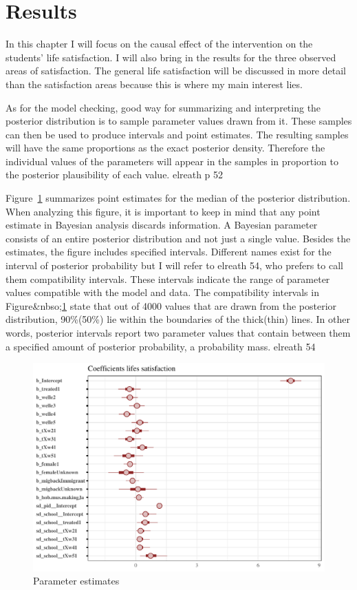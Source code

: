 \documentclass[a4, 12pt]{article}
\begin{document}
\hypertarget{results}{%
\section{Results}\label{results}}

\label{ch:results}
In this chapter I will focus on the causal effect of the intervention on the students' life satisfaction. I will also bring in the results for the three observed areas of satisfaction. The general life satisfaction will be discussed in more detail than the satisfaction areas because this is where my main interest lies.

As for the model checking, good way for summarizing and interpreting the posterior distribution is to sample parameter values drawn from it. These samples can then be used to produce intervals and point estimates. The resulting samples will have the same proportions as the exact posterior density. Therefore the individual values of the parameters will appear in the samples in proportion to the posterior plausibility of each value. elreath p 52

Figure~\ref{fig:m1-coef} summarizes point estimates for the median of the posterior distribution. When analyzing this figure, it is important to keep in mind that any point estimate in Bayesian analysis discards information. A Bayesian parameter consists of an entire posterior distribution and not just a single value. Besides the estimates, the figure includes specified intervals. Different names exist for the interval of posterior probability but I will refer to elreath 54, who prefers to call them compatibility intervals. These intervals indicate the range of parameter values compatible with the model and data.
The compatibility intervals in Figure\&nbso;\ref{fig:m1-coef} state that out of 4000 values that are drawn from the posterior distribution, 90\%(50\%) lie within the boundaries of the thick(thin) lines. In other words, posterior intervals report two parameter values that contain between them a specified amount of posterior probability, a probability mass. elreath 54

\begin{figure}[H]

{\centering \includegraphics[width=0.8\linewidth,]{../figures/m1_coef} 

}

\caption{Parameter estimates}\label{fig:m1-coef}
\end{figure}
\end{document}

